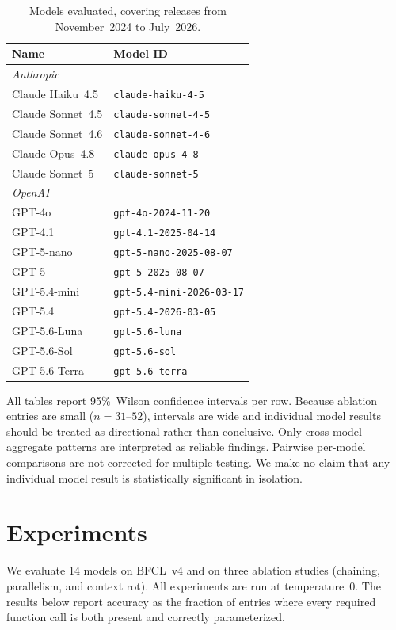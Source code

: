 \documentclass[11pt]{article}
\newcommand{\bfcl}{BFCL~v4}
\newcommand{\nmodels}{14}
\begin{document}
\begin{table}[t]
\centering
\footnotesize
\setlength{\tabcolsep}{4pt}
\begin{tabular}{ll}
\toprule
\textbf{Name} & \textbf{Model ID} \\
\midrule
\multicolumn{2}{l}{\textit{Anthropic}} \\
Claude Haiku~4.5  & \texttt{claude-haiku-4-5} \\
Claude Sonnet~4.5 & \texttt{claude-sonnet-4-5} \\
Claude Sonnet~4.6 & \texttt{claude-sonnet-4-6} \\
Claude Opus~4.8   & \texttt{claude-opus-4-8} \\
Claude Sonnet~5   & \texttt{claude-sonnet-5} \\
\midrule
\multicolumn{2}{l}{\textit{OpenAI}} \\
GPT-4o        & \texttt{gpt-4o-2024-11-20} \\
GPT-4.1       & \texttt{gpt-4.1-2025-04-14} \\
GPT-5-nano    & \texttt{gpt-5-nano-2025-08-07} \\
GPT-5         & \texttt{gpt-5-2025-08-07} \\
GPT-5.4-mini  & \texttt{gpt-5.4-mini-2026-03-17} \\
GPT-5.4       & \texttt{gpt-5.4-2026-03-05} \\
GPT-5.6-Luna  & \texttt{gpt-5.6-luna} \\
GPT-5.6-Sol   & \texttt{gpt-5.6-sol} \\
GPT-5.6-Terra & \texttt{gpt-5.6-terra} \\
\bottomrule
\end{tabular}
\caption{Models evaluated, covering releases from November~2024 to July~2026.}
\label{tab:models}
\end{table}
All tables report 95\%~Wilson confidence intervals per row.
Because ablation entries are small ($n = 31$--$52$), intervals are wide and
individual model results should be treated as directional rather than conclusive.
Only cross-model aggregate patterns are interpreted as reliable findings.
Pairwise per-model comparisons are not corrected for multiple testing. We make no
claim that any individual model result is statistically significant in isolation.

\section{Experiments}

We evaluate \nmodels{} models on \bfcl{} and on three ablation studies (chaining,
parallelism, and context rot).
All experiments are run at temperature~0.
The results below report accuracy as the fraction of entries where every required
function call is both present and correctly parameterized.
\end{document}
